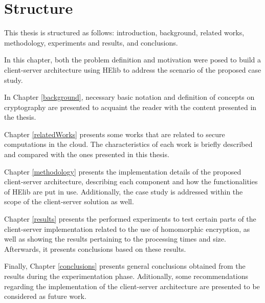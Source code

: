 \section{Structure}
This thesis is structured as follows: introduction, background, related works, methodology, experiments and results, and conclusions.

In this chapter, both the problem definition and motivation were posed to build a client-server architecture using HElib to address the scenario of the proposed case study.

In Chapter \ref{background}, necessary basic notation and definition of concepts on cryptography are presented to acquaint the reader with the content presented in the thesis.

Chapter \ref{relatedWorks} presents some works that are related to secure computations in the cloud. The characteristics of each work is briefly described and compared with the ones presented in this thesis.

Chapter \ref{methodology} presents the implementation details of the proposed client-server architecture, describing each component and how the functionalities of HElib are put in use. Additionally, the case study is addressed within the scope of the client-server solution as well.

Chapter \ref{results} presents the performed experiments to test certain parts of the client-server implementation related to the use of homomorphic encryption, as well as showing the results pertaining to the processing times and size. Afterwards, it presents conclusions based on these results.

Finally, Chapter \ref{conclusions} presents general conclusions obtained from the results during the experimentation phase. Aditionally, some recommendations regarding the implementation of the client-server architecture are presented to be considered as future work.

\clearpage

